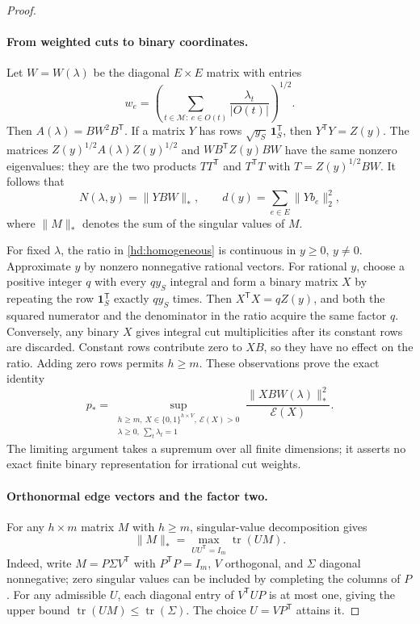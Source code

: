 \begin{proof}
\paragraph{From weighted cuts to binary coordinates.}
Let $W=W(\lambda)$ be the diagonal $E\times E$ matrix with entries
\begin{equation}
\label{hd:weights}
 w_e=\left(\sum_{t\in\mathcal M:\ e\in O(t)}
                      \frac{\lambda_t}{|O(t)|}\right)^{1/2}.
\end{equation}
Then $A(\lambda)=BW^2B^{\mathsf T}$.  If a matrix $Y$ has rows
$\sqrt{y_S}\,\mathbf1_S^{\mathsf T}$, then $Y^{\mathsf T}Y=Z(y)$.
The matrices $Z(y)^{1/2}A(\lambda)Z(y)^{1/2}$ and
$WB^{\mathsf T}Z(y)BW$ have the same nonzero eigenvalues: they are
the two products $TT^{\mathsf T}$ and $T^{\mathsf T}T$ with
$T=Z(y)^{1/2}BW$.  It follows that
\[
 N(\lambda,y)=\|YBW\|_*,\qquad
 d(y)=\sum_{e\in E}\|Yb_e\|_2^2,
\]
where $\|M\|_*$ denotes the sum of the singular values of $M$.

For fixed $\lambda$, the ratio in \eqref{hd:homogeneous} is continuous
in $y\geq0$, $y\ne0$.  Approximate $y$ by nonzero nonnegative rational
vectors.  For rational $y$, choose a positive integer $q$ with every
$qy_S$ integral and form a binary matrix $X$ by repeating the row
$\mathbf1_S^{\mathsf T}$ exactly $qy_S$ times.  Then
$X^{\mathsf T}X=qZ(y)$, and both the squared numerator and the
denominator in the ratio acquire the same factor $q$.  Conversely,
any binary $X$ gives integral cut multiplicities after its constant
rows are discarded.  Constant rows contribute zero to $XB$, so they
have no effect on the ratio.  Adding zero rows permits $h\geq m$.
These observations prove the exact identity
\begin{equation}
\label{hd:binary-nuclear}
 p_*=
 \sup_{\substack{h\geq m,\ X\in\{0,1\}^{h\times V},\ \mathcal E(X)>0\\
                  \lambda\geq0,\ \sum_t\lambda_t=1}}
 \frac{\|XBW(\lambda)\|_*^2}{\mathcal E(X)}.
\end{equation}
The limiting argument takes a supremum over all finite dimensions;
it asserts no exact finite binary representation for irrational
cut weights.

\paragraph{Orthonormal edge vectors and the factor two.}
For any $h\times m$ matrix $M$ with $h\geq m$, singular-value
decomposition gives
\begin{equation}
\label{hd:polar}
 \|M\|_*=\max_{UU^{\mathsf T}=I_m}\operatorname{tr}(UM).
\end{equation}
Indeed, write $M=P\Sigma V^{\mathsf T}$ with
$P^{\mathsf T}P=I_m$, $V$ orthogonal, and $\Sigma$ diagonal
nonnegative; zero singular values can be included by completing the
columns of $P$.  For any admissible $U$, each diagonal entry of
$V^{\mathsf T}UP$ is at most one, giving the upper bound
$\operatorname{tr}(UM)\leq\operatorname{tr}(\Sigma)$.
The choice $U=VP^{\mathsf T}$ attains it.


\end{proof}
